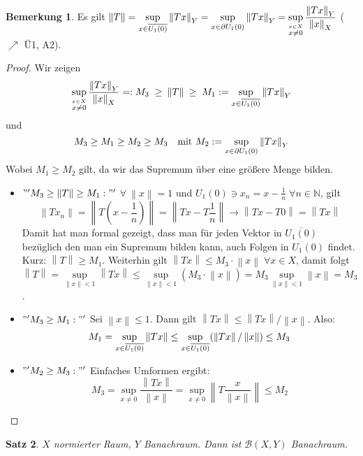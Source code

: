 \documentclass[ngerman]{report}
\theoremstyle{plain}%
\newtheorem{thm}{Satz}[chapter]
\theoremstyle{definition}%
\theoremstyle{myStyle}
\newtheorem{bem}[thm]{Bemerkung}
\newcommand{\N}{\mathbb{N}}
\newcommand{\BS}[1][X,Y]{\mathcal{B}(#1)} %
\newcommand{\norm}[1]{\left \|#1\right\| }
\newcommand{\U}[2][1]{U_{#1}(#2)} %
\newcommand{\EK}{\U{0}} %
\newcommand{\supT}[1][a]{
	\IfEqCase{#1}{
	{A}{\sup_{x \in \overline{\EK}}} 
	{R}{\sup_{x \in \partial\EK}}
	{a}{\sup_{x \in \EK}}
	}
} %
\newcommand{\disp}{\displaystyle}
\newcommand{\ov}[1]{\overline{#1}}
\begin{document}
	\begin{bem}
		Es gilt 
		$\disp \norm{T} = \supT[A]\norm{Tx}_Y = \supT[R] \norm{Tx}_Y
		= \sup_{\overset{x \in X}{x \not = 0}} \frac{\norm{Tx}_Y}{\norm{x}_X}$
		($\nearrow$ Ü1, A2).

		\begin{proof}
			Wir zeigen  
				$$\sup_{\overset{x \in X}{x \not = 0}} \frac{\norm{Tx}_Y}{\norm{x}_X} =:M_3 \; \geq \: \norm{T} \: \geq \; M_1 := \supT[A]\norm{Tx}_Y $$ 
				und 
				$$ M_3 \geq M_1\geq M_2 \geq M_3 \quad \text{mit } M_2 := \supT[R] \norm{Tx}_Y$$ 
			Wobei $M_1 \geq M_2$ gilt, da wir das Supremum über eine größere Menge bilden.
			\begin{itemize}[  ]

				\item $"' M_3 \geq \norm{T} \geq M_1: "'$ $\forall \: \norm{x} = 1$ und $\EK \ni x_n = x - \frac{1}{n} \; \forall n\in\N$, gilt 
				$$\norm{Tx_n} = \norm{T(x-\frac{1}{n})} = \norm{Tx - T\frac{1}{n}} \to \norm{Tx - T0} = \norm{Tx}$$ 
				Damit hat man formal gezeigt, dass man für jeden Vektor in $\ov{\EK}$ bezüglich den man ein Supremum bilden kann, auch Folgen in $\EK$ findet. Kurz: $\norm{T} \geq M_1$.
				Weiterhin gilt $\norm{Tx} \leq M_3 \cdot \norm{x} \; \forall x\in X $, damit folgt 
					$$ \norm{T} = \sup_{\norm{x} < 1} \norm{Tx} \leq \sup_{\norm{x} < 1} (M_3 \cdot \norm{x}) = M_3 \sup_{\norm{x} < 1} \norm{x} = M_3$$.

				\item $\disp "' M_3 \geq  M_1: "'$ Sei $\norm{x} \leq 1$. Dann gilt $\norm{Tx} \leq \norm{Tx}/\norm{x}$. Also:
					$$ M_1 =  \supT[A]\norm{Tx} \leq \supT[A] (\norm{Tx}/ \norm{x}) \leq  M_3$$

				\item $\disp "' M_2 \geq  M_3: "'$ Einfaches Umformen ergibt:
					$$ M_3 = \sup_{{x \not = 0}} \frac{\norm{Tx}}{\norm{x}} = \sup_{{x \not = 0}} \norm{T\frac{x}{\norm{x}}} \leq M_2$$ 	
				
			\end{itemize}
		\end{proof}
	\end{bem}
	\begin{thm}
		$X$ normierter Raum, $Y$ Banachraum. Dann ist $\BS$ Banachraum.
	\end{thm}
\end{document}
